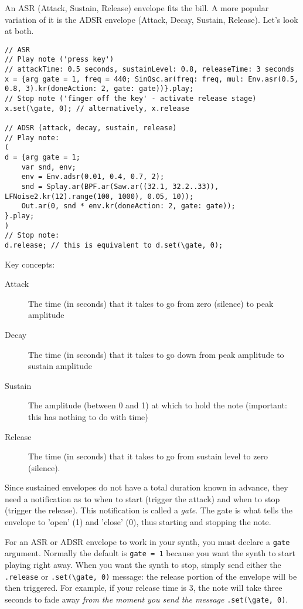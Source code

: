 An ASR (Attack, Sustain, Release) envelope fits the bill. A more popular variation of it is the ADSR envelope (Attack, Decay, Sustain, Release). Let's look at both.

 
\begin{lstlisting}[style=SuperCollider-IDE, basicstyle=\scttfamily\footnotesize]
// ASR
// Play note ('press key')
// attackTime: 0.5 seconds, sustainLevel: 0.8, releaseTime: 3 seconds
x = {arg gate = 1, freq = 440; SinOsc.ar(freq: freq, mul: Env.asr(0.5, 0.8, 3).kr(doneAction: 2, gate: gate))}.play;
// Stop note ('finger off the key' - activate release stage)
x.set(\gate, 0); // alternatively, x.release

// ADSR (attack, decay, sustain, release)
// Play note:
(
d = {arg gate = 1;
	var snd, env;
	env = Env.adsr(0.01, 0.4, 0.7, 2);
	snd = Splay.ar(BPF.ar(Saw.ar((32.1, 32.2..33)), LFNoise2.kr(12).range(100, 1000), 0.05, 10));
	Out.ar(0, snd * env.kr(doneAction: 2, gate: gate));
}.play;
)
// Stop note:
d.release; // this is equivalent to d.set(\gate, 0);
\end{lstlisting}
 

Key concepts:

\begin{description}
\item[Attack] The time (in seconds) that it takes to go from zero (silence) to peak amplitude
\item[Decay] The time (in seconds) that it takes to go down from peak amplitude to sustain amplitude
\item[Sustain] The amplitude (between 0 and 1) at which to hold the note (important: this has nothing to do with time)
\item[Release] The time (in seconds) that it takes to go from sustain level to zero (silence).
\end{description}

Since sustained envelopes do not have a total duration known in advance, they need a notification as to when to start (trigger the attack) and when to stop (trigger the release). This notification is called a \emph{gate}. The gate is what tells the envelope to 'open' (1) and 'close' (0), thus starting and stopping the note.

For an ASR or ADSR envelope to work in your synth, you must declare a \texttt{gate} argument. Normally the default is \texttt{gate = 1} because you want the synth to start playing right away. When you want the synth to stop, simply send either the \texttt{.release} or \texttt{.set(\textbackslash gate, 0)} message: the release portion of the envelope will be then triggered. For example, if your release time is 3, the note will take three seconds to fade away \emph{from the moment you send the message} \texttt{.set(\textbackslash gate, 0)}.


